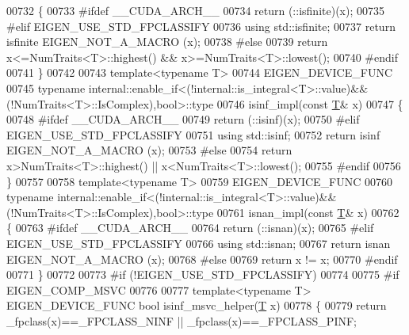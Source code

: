 \begin{DoxyCode}
00732 \{
00733 \textcolor{preprocessor}{  #ifdef \_\_CUDA\_ARCH\_\_}
00734     \textcolor{keywordflow}{return} (::isfinite)(x);
00735 \textcolor{preprocessor}{  #elif EIGEN\_USE\_STD\_FPCLASSIFY}
00736     \textcolor{keyword}{using} std::isfinite;
00737     \textcolor{keywordflow}{return} isfinite EIGEN\_NOT\_A\_MACRO (x);
00738 \textcolor{preprocessor}{  #else}
00739     \textcolor{keywordflow}{return} x<=NumTraits<T>::highest() && x>=NumTraits<T>::lowest();
00740 \textcolor{preprocessor}{  #endif}
00741 \}
00742 
00743 \textcolor{keyword}{template}<\textcolor{keyword}{typename} T>
00744 EIGEN\_DEVICE\_FUNC
00745 \textcolor{keyword}{typename} internal::enable\_if<(!internal::is\_integral<T>::value)&&(!NumTraits<T>::IsComplex),\textcolor{keywordtype}{bool}>::type
00746 isinf\_impl(\textcolor{keyword}{const} \hyperlink{group___sparse_core___module_class_eigen_1_1_triplet}{T}& x)
00747 \{
00748 \textcolor{preprocessor}{  #ifdef \_\_CUDA\_ARCH\_\_}
00749     \textcolor{keywordflow}{return} (::isinf)(x);
00750 \textcolor{preprocessor}{  #elif EIGEN\_USE\_STD\_FPCLASSIFY}
00751     \textcolor{keyword}{using} std::isinf;
00752     \textcolor{keywordflow}{return} isinf EIGEN\_NOT\_A\_MACRO (x);
00753 \textcolor{preprocessor}{  #else}
00754     \textcolor{keywordflow}{return} x>NumTraits<T>::highest() || x<NumTraits<T>::lowest();
00755 \textcolor{preprocessor}{  #endif}
00756 \}
00757 
00758 \textcolor{keyword}{template}<\textcolor{keyword}{typename} T>
00759 EIGEN\_DEVICE\_FUNC
00760 \textcolor{keyword}{typename} internal::enable\_if<(!internal::is\_integral<T>::value)&&(!NumTraits<T>::IsComplex),\textcolor{keywordtype}{bool}>::type
00761 isnan\_impl(\textcolor{keyword}{const} \hyperlink{group___sparse_core___module_class_eigen_1_1_triplet}{T}& x)
00762 \{
00763 \textcolor{preprocessor}{  #ifdef \_\_CUDA\_ARCH\_\_}
00764     \textcolor{keywordflow}{return} (::isnan)(x);
00765 \textcolor{preprocessor}{  #elif EIGEN\_USE\_STD\_FPCLASSIFY}
00766     \textcolor{keyword}{using} std::isnan;
00767     \textcolor{keywordflow}{return} isnan EIGEN\_NOT\_A\_MACRO (x);
00768 \textcolor{preprocessor}{  #else}
00769     \textcolor{keywordflow}{return} x != x;
00770 \textcolor{preprocessor}{  #endif}
00771 \}
00772 
00773 \textcolor{preprocessor}{#if (!EIGEN\_USE\_STD\_FPCLASSIFY)}
00774 
00775 \textcolor{preprocessor}{#if EIGEN\_COMP\_MSVC}
00776 
00777 \textcolor{keyword}{template}<\textcolor{keyword}{typename} T> EIGEN\_DEVICE\_FUNC \textcolor{keywordtype}{bool} isinf\_msvc\_helper(\hyperlink{group___sparse_core___module_class_eigen_1_1_triplet}{T} x)
00778 \{
00779   \textcolor{keywordflow}{return} \_fpclass(x)==\_FPCLASS\_NINF || \_fpclass(x)==\_FPCLASS\_PINF;

\end{DoxyCode}
